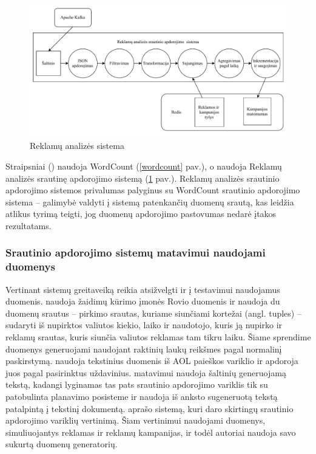 \documentclass{VUMIFPSbakalaurinis}
\begin{document}
\begin{figure}[H]
    \includegraphics[width=15cm]{img/yahoo.pdf}
    \caption{Reklamų analizės sistema \cite{Chintapalli2016Benchmarking}}
    \label{yahoo}
\end{figure} 

Straipsniai (\cite{Qian2016Benchmarking, huang2010hibench, dhalion}) naudoja WordCount (\ref{wordcount} pav.), o \cite{Chintapalli2016Benchmarking, vaquero2018autotuning} naudoja Reklamų analizės srautinę apdorojimo sistemą (\ref{yahoo} pav.). Reklamų analizės srautinio apdorojimo sistemos privalumas palyginus su WordCount srautinio apdorojimo sistema – galimybė valdyti į sistemą patenkančių duomenų srautą, kas leidžia atlikus tyrimą teigti, jog duomenų apdorojimo pastovumas nedarė įtakos rezultatams.

\subsubsection{Srautinio apdorojimo sistemų matavimui naudojami duomenys}

Vertinant sistemų greitaveiką reikia atsižvelgti ir į testavimui naudojamus duomenis. \cite{Karimov2018BenchmarkingDS} naudoja žaidimų kūrimo įmonės Rovio duomenis ir naudoja du duomenų srautus – pirkimo srautas, kuriame siunčiami kortežai (angl. tuples) – sudaryti iš nupirktos valiutos kiekio, laiko ir naudotojo, kuris ją nupirko ir reklamų srautas, kuris siunčia valiutos reklamas tam tikru laiku. Šiame sprendime duomenys generuojami naudojant raktinių laukų reikšmes pagal normalinį paskirstymą. \cite{Qian2016Benchmarking} naudoja tekstinius duomenis iš AOL paieškos variklio ir apdoroja juos pagal pasirinktus uždavinius. \cite{zhang2020heron} matavimui naudoja šaltinių generuojamą tekstą, kadangi lyginamas tas pats srautinio apdorojimo variklis tik su patobulinta planavimo posisteme ir naudoja iš anksto sugeneruotą tekstą patalpintą į tekstinį dokumentą. \cite{Chintapalli2016Benchmarking} aprašo sistemą, kuri daro skirtingų srautinio apdorojimo variklių vertinimą. Šiam vertinimui naudojami duomenys, simuliuojantys reklamas ir reklamų kampanijas, ir todėl autoriai naudoja savo sukurtą duomenų generatorių. 
\end{document}

